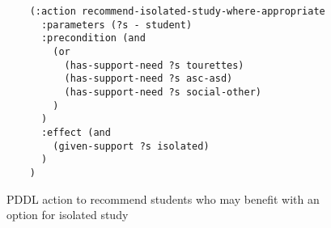 \begin{figure}[t]
    \begin{lstlisting}
    (:action recommend-isolated-study-where-appropriate
      :parameters (?s - student)
      :precondition (and 
        (or
          (has-support-need ?s tourettes)
          (has-support-need ?s asc-asd)
          (has-support-need ?s social-other)
        )
      )
      :effect (and 
        (given-support ?s isolated)
      )
    )
    \end{lstlisting}
    \caption{PDDL action to recommend students who may benefit with an option for isolated study}\label{fig:isolated-study}
\end{figure}